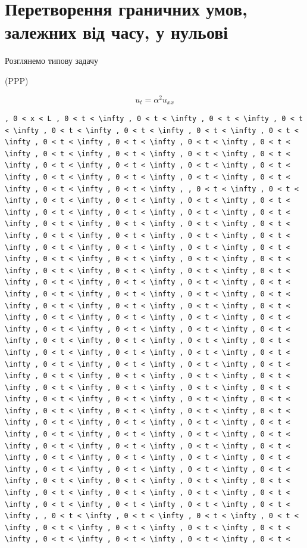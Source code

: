 \documentclass[
  ukrainian,
]{article}
\begin{document}
\section{Перетворення граничних умов, залежних від часу, у
нульові}\label{ux43fux435ux440ux435ux442ux432ux43eux440ux435ux43dux43dux44f-ux433ux440ux430ux43dux438ux447ux43dux438ux445-ux443ux43cux43eux432-ux437ux430ux43bux435ux436ux43dux438ux445-ux432ux456ux434-ux447ux430ux441ux443-ux443-ux43dux443ux43bux44cux43eux432ux456}

Розглянемо типову задачу

(PPP)

\[
u_t = \alpha^2 u_{xx}
\]

\begin{verbatim}
, 0 < x < L , 0 < t < \infty , 0 < t < \infty , 0 < t < \infty , 0 < t < \infty , 0 < t < \infty , 0 < t < \infty , 0 < t < \infty , 0 < t < \infty , 0 < t < \infty , 0 < t < \infty , 0 < t < \infty , 0 < t < \infty , 0 < t < \infty , 0 < t < \infty , 0 < t < \infty , 0 < t < \infty , 0 < t < \infty , 0 < t < \infty , 0 < t < \infty , 0 < t < \infty , 0 < t < \infty , 0 < t < \infty , 0 < t < \infty , 0 < t < \infty , 0 < t < \infty , 0 < t < \infty , , 0 < t < \infty , 0 < t < \infty , 0 < t < \infty , 0 < t < \infty , 0 < t < \infty , 0 < t < \infty , 0 < t < \infty , 0 < t < \infty , 0 < t < \infty , 0 < t < \infty , 0 < t < \infty , 0 < t < \infty , 0 < t < \infty , 0 < t < \infty , 0 < t < \infty , 0 < t < \infty , 0 < t < \infty , 0 < t < \infty , 0 < t < \infty , 0 < t < \infty , 0 < t < \infty , 0 < t < \infty , 0 < t < \infty , 0 < t < \infty , 0 < t < \infty , 0 < t < \infty , 0 < t < \infty , 0 < t < \infty , 0 < t < \infty , 0 < t < \infty , 0 < t < \infty , 0 < t < \infty , 0 < t < \infty , 0 < t < \infty , 0 < t < \infty , 0 < t < \infty , 0 < t < \infty , 0 < t < \infty , 0 < t < \infty , 0 < t < \infty , 0 < t < \infty , 0 < t < \infty , 0 < t < \infty , 0 < t < \infty , 0 < t < \infty , 0 < t < \infty , 0 < t < \infty , 0 < t < \infty , 0 < t < \infty , 0 < t < \infty , 0 < t < \infty , 0 < t < \infty , 0 < t < \infty , 0 < t < \infty , 0 < t < \infty , 0 < t < \infty , 0 < t < \infty , 0 < t < \infty , 0 < t < \infty , 0 < t < \infty , 0 < t < \infty , 0 < t < \infty , 0 < t < \infty , 0 < t < \infty , 0 < t < \infty , 0 < t < \infty , 0 < t < \infty , 0 < t < \infty , 0 < t < \infty , 0 < t < \infty , 0 < t < \infty , 0 < t < \infty , 0 < t < \infty , 0 < t < \infty , 0 < t < \infty , 0 < t < \infty , 0 < t < \infty , 0 < t < \infty , 0 < t < \infty , 0 < t < \infty , 0 < t < \infty , 0 < t < \infty , 0 < t < \infty , 0 < t < \infty , 0 < t < \infty , 0 < t < \infty , 0 < t < \infty , 0 < t < \infty , 0 < t < \infty , 0 < t < \infty , 0 < t < \infty , 0 < t < \infty , 0 < t < \infty , 0 < t < \infty , 0 < t < \infty , 0 < t < \infty , 0 < t < \infty , 0 < t < \infty , 0 < t < \infty , 0 < t < \infty , 0 < t < \infty , 0 < t < \infty , 0 < t < \infty , 0 < t < \infty , 0 < t < \infty , 0 < t < \infty , 0 < t < \infty , 0 < t < \infty , 0 < t < \infty , 0 < t < \infty , , 0 < t < \infty , 0 < t < \infty , 0 < t < \infty , 0 < t < \infty , 0 < t < \infty , 0 < t < \infty , 0 < t < \infty , 0 < t < \infty , 0 < t < \infty , 0 < t < \infty , 0 < t < \infty , 0 < t < 
\end{verbatim}
\end{document}
